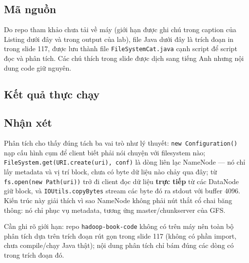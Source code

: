 \documentclass[12pt,a4paper,oneside]{article}
\begin{document}
\subsection{Mã nguồn}

Do repo tham khảo chưa tải về máy (giới hạn được ghi chú trong caption của Listing dưới đây và trong output của lab), file Java dưới đây là trích đoạn in trong slide 117, được lưu thành file \texttt{FileSystemCat.java} cạnh script để script đọc và phân tích. Các chú thích trong slide được dịch sang tiếng Anh nhưng nội dung code giữ nguyên.





\subsection{Kết quả thực chạy}



\subsection{Nhận xét}

Phân tích cho thấy đúng tách ba vai trò như lý thuyết: \texttt{new Configuration()} nạp cấu hình cụm để client biết phải nói chuyện với filesystem nào; \texttt{FileSystem.get(URI.create(uri), conf)} là dòng liên lạc NameNode --- nó chỉ lấy metadata và vị trí block, chưa có byte dữ liệu nào chảy qua đây; từ \texttt{fs.open(new Path(uri))} trở đi client đọc dữ liệu \textbf{trực tiếp} từ các DataNode giữ block, và \texttt{IOUtils.copyBytes} stream các byte đó ra stdout với buffer 4096. Kiến trúc này giải thích vì sao NameNode không phải nút thắt cổ chai băng thông: nó chỉ phục vụ metadata, tương ứng master/chunkserver của GFS.

Cần ghi rõ giới hạn: repo \texttt{hadoop-book-code} không có trên máy nên toàn bộ phân tích dựa trên trích đoạn rút gọn trong slide 117 (không có phần import, chưa compile/chạy Java thật); nội dung phân tích chỉ bám đúng các dòng có trong trích đoạn đó.

\end{document}
